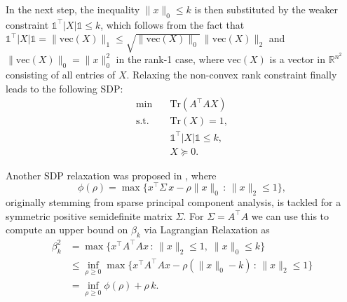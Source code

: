 \documentclass[journal]{IEEEtran}
\newcommand{\suchthat}{\,:\,}
\newcommand{\abs}[1]{\lvert{#1}\rvert}
\newcommand{\Norm}[2]{\lVert{#1}\rVert_{#2}}
\newcommand{\T}{^{\top}}
\newcommand{\Tr}{\text{Tr}}
\newcommand{\vect}{\text{vec}}
\newcommand{\R}{\mathds{R}}
\newcommand{\ones}{\mathds{1}}
\begin{document}
In the next step, the inequality $\Norm{x}{0} \leq k$ is then substituted by the weaker constraint $\ones\T
\abs{X} \ones \leq k$, which follows from the fact that $\ones\T\abs{X} \ones = \Norm{\vect(X)}{1}\leq \sqrt{\Norm{\vect(X)}{0}}\, \Norm{\vect(X)}{2}$ and $\Norm{\vect(X)}{0}=\Norm{x}{0}^2$ in the rank-1 case, where $\vect(X)$ is a vector
in $\R^{n^2}$ consisting of all entries of $X$. 
Relaxing the non-convex rank constraint finally leads to the following SDP:
\begin{align}\label{Asp07}
 \min \quad & \Tr(A\T A X) \nonumber \\
 \text{s.t.} \quad & \Tr(X) = 1, \tag{A1} \\
 & \ones\T \abs{X} \ones \leq k, \nonumber \\
 & X \succeq 0. \nonumber
\end{align}

Another SDP relaxation was proposed in \cite{Asp08}, where
\begin{equation}\label{phi}
  \phi(\rho) = \max \big\{ x\T \Sigma\, x - \rho \Norm{x}{0} \suchthat \Norm{x}{2} \leq 1 \big\},
\end{equation}
originally stemming from sparse principal component analysis, is tackled for a symmetric positive semidefinite matrix $\Sigma$. For
$\Sigma = A\T A$ we can use this to compute an upper bound on $\beta_k$ via Lagrangian Relaxation as
\begin{equation*}
 \begin{aligned}
  \beta_k^2 & = \max \big\{ x\T A\T A x \suchthat \Norm{x}{2} \leq 1,\; \Norm{x}{0} \leq k \big\}\\
	    & \leq \inf_{\rho \geq 0} \max \big\{ x\T A\T A x - \rho
            (\Norm{x}{0} - k) \suchthat \Norm{x}{2} \leq 1 \big\}\\
	    & = \inf_{\rho \geq 0} \phi(\rho) + \rho\, k.
 \end{aligned}
\end{equation*}
\end{document}
